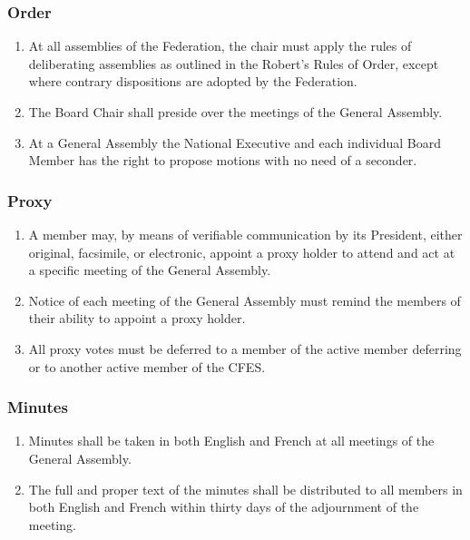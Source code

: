 \subsubsection{Order}
\label{order}

\begin{enumerate}
 \item
  At all assemblies of the Federation, the chair must apply the rules of deliberating assemblies as outlined in the Robert's Rules of Order, except where contrary dispositions are adopted by the Federation.
 \item
  The Board Chair shall preside over the meetings of the General Assembly.
 \item
  At a General Assembly the National Executive and each individual Board Member has the right to propose motions with no need of a seconder.
\end{enumerate}

\subsubsection{Proxy}
\label{proxy}

\begin{enumerate}
 \item
  A member may, by means of verifiable communication by its President, either original, facsimile, or electronic, appoint a proxy holder to attend and act at a specific meeting of the General Assembly.
 \item
  Notice of each meeting of the General Assembly must remind the members of their ability to appoint a proxy holder.
 \item
  All proxy votes must be deferred to a member of the active member deferring or to another active member of the CFES.
\end{enumerate}

\subsubsection{Minutes}
\label{minutes}

\begin{enumerate}
 \item
  Minutes shall be taken in both English and French at all meetings of the General Assembly.
 \item
  The full and proper text of the minutes shall be distributed to all members in both English and French within thirty days of the adjournment of the meeting.
\end{enumerate}

